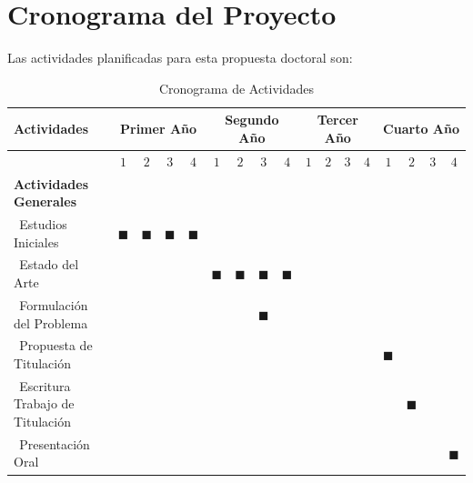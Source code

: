 \documentclass[12pt,a4paper]{article}
\begin{document}
\section{Cronograma del Proyecto}
Las actividades planificadas para esta propuesta doctoral son:
\clearpage

\begin{table}[H]
\caption{Cronograma de Actividades}
\begin{center}
\begin{tabular}{|p{4.0cm}|c|c|c|c|c|c|c|c|c|c|c|c|c|c|c|c|}
\hline
Actividades &                  \multicolumn{ 4}{|c}{Primer Año} &                 \multicolumn{ 4}{|c}{Segundo Año} &                  \multicolumn{ 4}{|c}{Tercer Año} &                 \multicolumn{ 4}{|c|}{Cuarto Año} \\
\hline
 & $1$ & $2$ & $3$ & $4$ & $1$ & $2$ & $3$ & $4$ & $1$ & $2$ & $3$ & $4$ & $1$ & $2$ & $3$ & $4$ \\
\hline
\hline
\textbf{Actividades Generales}  &  &  &  &  &      &  &  &  &      &  &  &  &      &  &  &  \\ \hline
$~~$Estudios Iniciales    & $\blacksquare$ & $\blacksquare$ & $\blacksquare$ & $\blacksquare$ &      &  &  &  &      &  &  &  &      &  &  &  \\ \hline
$~~$Estado del Arte   &  &  &  &  &     $\blacksquare$ & $\blacksquare$ & $\blacksquare$ & $\blacksquare$ &      &  &  &  &      &  &  &  \\ \hline
$~~$Formulación del Problema   &  &  &  &  &      &  & $\blacksquare$ &  &      &  &  &  &      &  &  &  \\ \hline
$~~$Propuesta de Titulación   &  &  &  &  &      &  &  &  &      &  &  &  &     $\blacksquare$ &  &  &  \\ \hline
$~~$Escritura Trabajo de Titulación      &  &  &  &  &      &  &  &  &      &  &  &  &      & $\blacksquare$ &  &  \\ \hline
$~~$Presentación Oral      &  &  &  &  &      &  &  &  &      &  &  &  &      &  &  & $\blacksquare$ \\ \hline \hline


\end{tabular}
\end{center}
\end{table}
\end{document}
